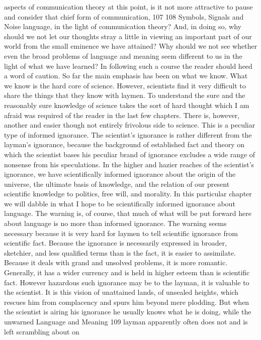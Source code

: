 {{{aspects of communication theory at this point, is it not more
attractive to pause and consider that chief form of communication,
107
108
Symbols, Signals and Noise
language, in the light of communication theory? And, in doing so,
why should we not let our thoughts stray a little in viewing an important
part of our world from the small eminence we have
attained? Why should we not see whether even the broad problems
of language and meaning seem different to us in the light of what
we have learned?
In following such a course the reader should heed a word of
caution. So far the main emphasis has been on what we know. What
we know is the hard core of science. However, scientists find it very
difficult to share the things that they know with laymen. To understand
the sure and the reasonably sure knowledge of science takes
the sort of hard thought which I am afraid was required of the
reader in the last few chapters.
There is, however, another and easier though not entirely frivolous
side to science. This is a peculiar type of informed ignorance.
The scientist’s ignorance is rather different from the layman’s
ignorance, because the background of established fact and theory
on which the scientist bases his peculiar brand of ignorance excludes
a wide range of nonsense from his speculations. In the higher
and hazier reaches of the scientist’s ignorance, we have scientifically
informed ignorance about the origin of the universe, the ultimate
basis of knowledge, and the relation of our present scientific knowledge
to politics, free will, and morality. In this particular chapter
we will dabble in what I hope to be scientifically informed ignorance
about language.
The warning is, of course, that much of what will be put forward
here about language is no more than informed ignorance. The
warning seems necessary because it is very hard for laymen to tell
scientific ignorance from scientific fact. Because the ignorance is
necessarily expressed in broader, sketchier, and less qualified terms
than is the fact, it is easier to assimilate. Because it deals with grand
and unsolved problems, it is more romantic. Generally, it has a
wider currency and is held in higher esteem than is scientific fact.
However hazardous such ignorance may be to the layman, it is
valuable to the scientist. It is this vision of unattained lands, of
unsealed heights, which rescues him from complacency and spurs
him beyond mere plodding. But when the scientist is airing his
ignorance he usually knows what he is doing, while the unwarned
Language and Meaning 109
layman apparently often does not and is left scrambling about on
}}}
